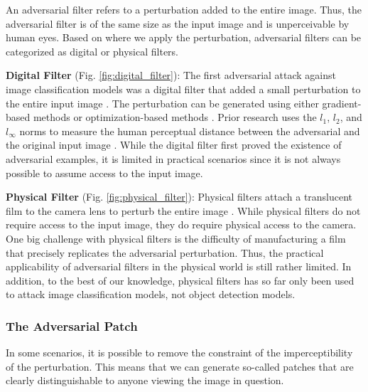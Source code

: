 An adversarial filter refers to a perturbation added to the entire image. Thus, the adversarial filter is of the same size as the input image and is unperceivable by human eyes. Based on where we apply the perturbation, adversarial filters can be categorized as digital or physical filters.

\textbf{Digital Filter} (Fig. \ref{fig:digital_filter}): The first adversarial attack against image classification models was a digital filter that added a small perturbation to the entire input image \citep{goodfellow2014explaining}. The perturbation can be generated using either gradient-based methods \citep{madryMSTV18} \citep{kurakin2018adversarial} \citep{wong2019wasserstein} \citep{croce2020reliable} or optimization-based methods \citep{papernot2016transferability} \citep{carlini2017towards} \citep{qin2019imperceptible}. Prior research uses the $l_1$, $l_2$, and $l_{\infty}$ norms to measure the human perceptual distance between the adversarial and the original input image \citep{miyato2015distributional} \citep{sabour2015adversarial} \citep{chen2018ead}. While the digital filter first proved the existence of adversarial examples, it is limited in practical scenarios since it is not always possible to assume access to the input image.

\textbf{Physical Filter} (Fig. \ref{fig:physical_filter}): Physical filters attach a translucent film to the camera lens to perturb the entire image \citep{li2019adversarial}. While physical filters do not require access to the input image, they do require physical access to the camera. One big challenge with physical filters is the difficulty of manufacturing a film that precisely replicates the adversarial perturbation. Thus, the practical applicability of adversarial filters in the physical world is still rather limited. In addition, to the best of our knowledge, physical filters has so far only been used to attack image classification models, not object detection models. 


\subsubsection{The Adversarial Patch}

In some scenarios, it is possible to remove the constraint of the imperceptibility of the perturbation. This means that we can generate so-called patches that are clearly distinguishable to anyone viewing the image in question. 

